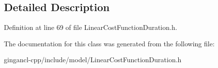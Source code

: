 \subsection{Detailed Description}




Definition at line 69 of file LinearCostFunctionDuration.h.

The documentation for this class was generated from the following file:\begin{CompactItemize}
\item 
gingancl-cpp/include/model/LinearCostFunctionDuration.h\end{CompactItemize}
